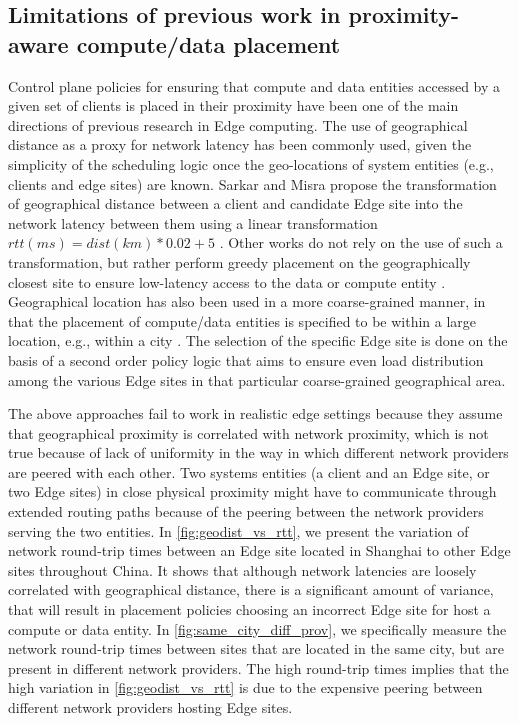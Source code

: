 \subsection{Limitations of previous work in proximity-aware compute/data placement}
\label{sec:nw_prox_prev_work}
Control plane policies for ensuring that compute and data entities accessed by a given set of clients is placed in their proximity have been one of the main directions of previous research in Edge computing. The use of geographical distance as a proxy for network latency has been commonly used, given the simplicity of the scheduling logic once the geo-locations of system entities (e.g., clients and edge sites) are known. Sarkar and Misra \cite{sarkar2016theoretical} propose the transformation of geographical distance between a client and candidate Edge site into the network latency between them using a linear transformation $rtt\left(ms\right) = dist \left(km\right) * 0.02 + 5$ \cite{qureshi2010power}. Other works do not rely on the use of such a transformation, but rather perform greedy placement on the geographically closest site to ensure low-latency access to the data or compute entity \cite{lahderanta2021edge}. Geographical location has also been used in a more coarse-grained manner, in that the placement of compute/data entities is specified to be within a large location, e.g., within a city \cite{vilaccageolocate}. The selection of the specific Edge site is done on the basis of a second order policy logic that aims to ensure even load distribution among the various Edge sites in that particular coarse-grained geographical area. 
\par The above approaches fail to work in realistic edge settings because they assume that geographical proximity is correlated with network proximity, which is not true because of lack of uniformity in the way in which different network providers are peered with each other. Two systems entities (a client and an Edge site, or two Edge sites) in close physical proximity might have to communicate through extended routing paths because of the peering between the network providers serving the two entities. In \cref{fig:geodist_vs_rtt}, we present the variation of network round-trip times between an Edge site located in Shanghai to other Edge sites throughout China. It shows that although network latencies are loosely correlated with geographical distance, there is a significant amount of variance, that will result in placement policies choosing an incorrect Edge site for host a compute or data entity. In \cref{fig:same_city_diff_prov}, we specifically measure the network round-trip times between sites that are located in the same city, but are present in different network providers. The high round-trip times implies that the high variation in \cref{fig:geodist_vs_rtt} is due to the expensive peering between different network providers hosting Edge sites. 
